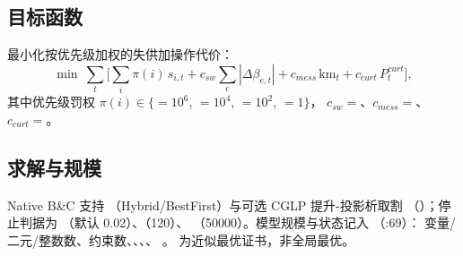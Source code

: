 \subsection{目标函数}
最小化按优先级加权的失供加操作代价：
\begin{equation}
\min\ \sum_t\Big[\sum_i \pi(i)\,s_{i,t}
+c_{sw}\!\sum_e|\Delta\beta_{e,t}|
+c_{mess}\,\mathrm{km}_t
+c_{curt}\,P^{curt}_t\Big],
\end{equation}
其中优先级罚权 $\pi(i)\in\{$$=10^6$, $=10^4$,
$=10^2$, $=1\}$，
$c_{sw}=$、$c_{mess}=$、
$c_{curt}=$。

\subsection{求解与规模}
Native B\&C 支持 （Hybrid/BestFirst）与可选 CGLP 提升-投影析取割
（）；停止判据为 （默认 0.02）、（120）、
（50000）。模型规模与状态记入 （:69）：
变量/二元/整数数、约束数、、、、
。 为近似最优证书，非全局最优。
